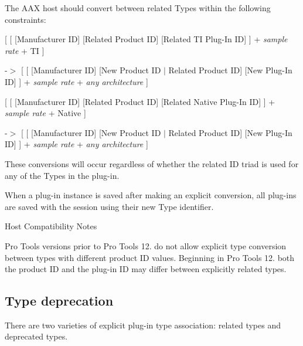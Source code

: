 The A\+A\+X host should convert between related Types within the following constraints\+: 
\begin{DoxyItemize}
\item \mbox{[} \mbox{[} \mbox{[}Manufacturer I\+D\mbox{]} \mbox{[}Related Product I\+D\mbox{]} \mbox{[}Related T\+I Plug-\/\+In I\+D\mbox{]} \mbox{]} + {\itshape sample rate} + T\+I \mbox{]} 
\begin{DoxyItemize}
\item -\/$>$ \mbox{[} \mbox{[} \mbox{[}Manufacturer I\+D\mbox{]} \mbox{[}New Product I\+D $\vert$ Related Product I\+D\mbox{]} \mbox{[}New Plug-\/\+In I\+D\mbox{]} \mbox{]} + {\itshape sample rate} + {\itshape any architecture} \mbox{]}  
\end{DoxyItemize}
\item \mbox{[} \mbox{[} \mbox{[}Manufacturer I\+D\mbox{]} \mbox{[}Related Product I\+D\mbox{]} \mbox{[}Related Native Plug-\/\+In I\+D\mbox{]} \mbox{]} + {\itshape sample rate} + Native \mbox{]} 
\begin{DoxyItemize}
\item -\/$>$ \mbox{[} \mbox{[} \mbox{[}Manufacturer I\+D\mbox{]} \mbox{[}New Product I\+D $\vert$ Related Product I\+D\mbox{]} \mbox{[}New Plug-\/\+In I\+D\mbox{]} \mbox{]} + {\itshape sample rate} + {\itshape any architecture} \mbox{]}  
\end{DoxyItemize}
\end{DoxyItemize}

These conversions will occur regardless of whether the related I\+D triad is used for any of the Types in the plug-\/in.

When a plug-\/in instance is saved after making an explicit conversion, all plug-\/ins are saved with the session using their new Type identifier.

\begin{DoxyRefDesc}{Host Compatibility Notes}
\item[\hyperlink{a00380__compatibility_notes000007}{Host Compatibility Notes}]Pro Tools versions prior to Pro Tools 12. do not allow explicit type conversion between types with different product I\+D values. Beginning in Pro Tools 12. both the product I\+D and the plug-\/in I\+D may differ between explicitly related types.\end{DoxyRefDesc}
\hypertarget{a00356_advancedTopics_relatedTypes_deprecation}{}\subsection{Type deprecation}\label{a00356_advancedTopics_relatedTypes_deprecation}
There are two varieties of explicit plug-\/in type association\+: related types and deprecated types.


